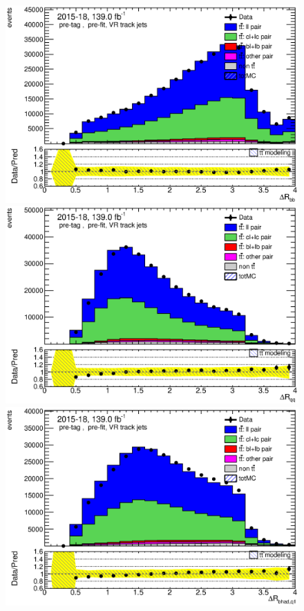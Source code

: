 \documentclass[letterpaper,12pt]{article}
\begin{document}
	\newpage
	\begin{figure}[H]
	\begin{minipage}[b]{.45\textwidth}
	\centering
	\includegraphics[width=1\textwidth]{Oct_distributions/pretagNoRwDL1rwithhighpTVRJets_scaledall/DataMC_dRbb.eps}
	\end{minipage}\hfill
	\begin{minipage}[b]{.45\textwidth}
	\centering
	\includegraphics[width=1\textwidth]{Oct_distributions/pretagNoRwDL1rwithhighpTVRJets_scaledall/DataMC_dRqq.eps}
	\end{minipage}\hfill
	\begin{minipage}[b]{.45\textwidth}
	\centering
	\includegraphics[width=1\textwidth]{Oct_distributions/pretagNoRwDL1rwithhighpTVRJets_scaledall/DataMC_dRbhadq1.eps}

\end{minipage}
\end{figure}
\end{document}
